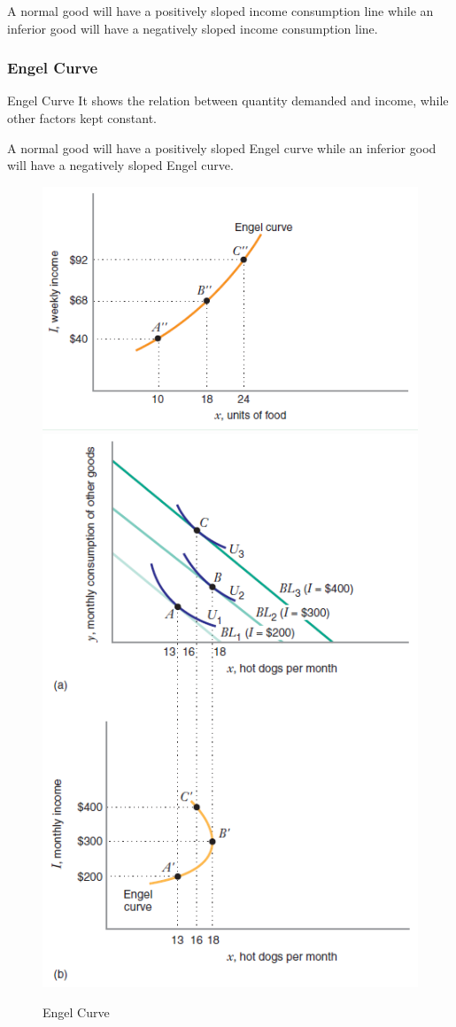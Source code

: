 \documentclass[../ECON-281-Notes.tex]{subfiles}
\begin{document}
A normal good will have a positively sloped income consumption line while an inferior good will have a negatively sloped income consumption line.

\subsubsection{Engel Curve}
\begin{Definition}
    {Engel Curve}
    It shows the relation between quantity demanded and income, while other factors kept constant.
\end{Definition}

A normal good will have a positively sloped Engel curve while an inferior good will have a negatively sloped Engel curve.

\begin{figure}[h!]
    \centering
    \includegraphics[width=0.8\columnwidth]{../assets/normal_engel_curve.png}
    \includegraphics[width=0.8\columnwidth]{../assets/inferior_engel_curve.png}
    \caption{Engel Curve}
    \label{fig:engel_curve}
\end{figure}
\newpage
\end{document}
